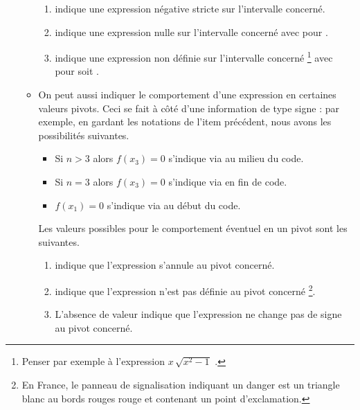 \documentclass[10pt, a4paper]{article}
\begin{document}
\begin{enumerate}
\begin{itemize}
\begin{enumerate}
            \item \tdocinlatex{-} indique une expression négative stricte sur l'intervalle concerné.

            \item {} indique une expression nulle sur l'intervalle concerné avec  pour .

            \item {} indique une expression non définie sur l'intervalle concerné
            \footnote{
                Penser par exemple à l'expression $x \, \sqrt{x^2 - 1}$ .
            }
            avec  pour  soit .
        \end{enumerate}


        \item On peut aussi indiquer le comportement d'une expression en certaines valeurs pivots. Ceci se fait à côté d'une information de type signe : par exemple, en gardant les notations de l'item précédent, nous avons les possibilités suivantes.
        \begin{itemize}
            \item Si $n > 3$ alors $f(x_3) = 0$ s'indique via  au milieu du code.

            \item Si $n = 3$ alors $f(x_3) = 0$ s'indique via  en fin de code.

            \item $f(x_1) = 0$ s'indique via     au début du code.
        \end{itemize}
        Les valeurs possibles pour le comportement éventuel en un pivot sont les suivantes.
        \begin{enumerate}
            \item {} indique que
l'expression s'annule au pivot concerné.

            \item \tdocinlatex{!} indique que
l'expression n'est pas définie au pivot concerné
            \footnote{
                En France, le panneau de signalisation indiquant un danger est un triangle blanc au bords rouges rouge et contenant un point d'exclamation.
            }.

            \item L'absence de valeur indique que l'expression ne change pas de signe au pivot concerné.
        \end{enumerate}
    \end{itemize}
\end{enumerate}
\end{document}
